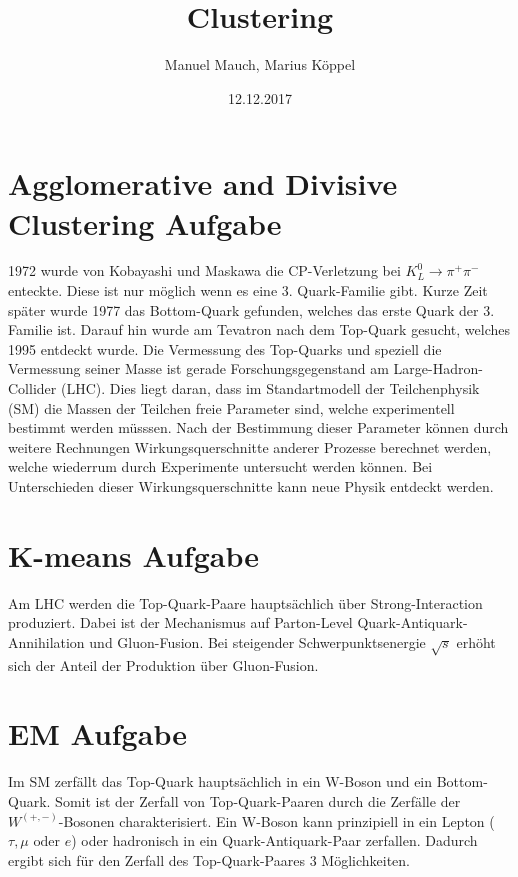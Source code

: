 \documentclass[a4paper]{article}
\title{Clustering}
\author{Manuel Mauch, Marius Köppel}
\date{12.12.2017}
\begin{document}
\maketitle

\section{Agglomerative and Divisive Clustering Aufgabe}
1972 wurde von Kobayashi und Maskawa die CP-Verletzung bei $K^0_L \rightarrow \pi^+ \pi^-$ enteckte. Diese ist nur möglich wenn es eine 3. Quark-Familie gibt. Kurze Zeit später wurde 1977 das Bottom-Quark gefunden, welches das erste Quark der 3. Familie ist. Darauf hin wurde am Tevatron nach dem Top-Quark gesucht, welches 1995 entdeckt wurde. Die Vermessung des Top-Quarks und speziell die Vermessung seiner Masse ist gerade Forschungsgegenstand am Large-Hadron-Collider (LHC). Dies liegt daran, dass im Standartmodell der Teilchenphysik (SM) die Massen der Teilchen freie Parameter sind, welche experimentell bestimmt werden müsssen. Nach der Bestimmung dieser Parameter können durch weitere Rechnungen Wirkungsquerschnitte anderer Prozesse berechnet werden, welche wiederrum durch Experimente untersucht werden können. Bei Unterschieden dieser Wirkungsquerschnitte kann neue Physik entdeckt werden.

\section{K-means Aufgabe}
Am LHC werden die Top-Quark-Paare hauptsächlich über Strong-Interaction produziert. Dabei ist der Mechanismus auf Parton-Level Quark-Antiquark-Annihilation und Gluon-Fusion. Bei steigender Schwerpunktsenergie $\sqrt{s}$ erhöht sich der Anteil der Produktion über Gluon-Fusion.

\section{EM Aufgabe}
Im SM zerfällt das Top-Quark hauptsächlich in ein W-Boson und ein Bottom-Quark. Somit ist der Zerfall von Top-Quark-Paaren durch die Zerfälle der $W^{(+,-)}$-Bosonen charakterisiert. Ein W-Boson kann prinzipiell in ein Lepton ($\tau, \mu \textrm{ oder } e$) oder hadronisch in ein Quark-Antiquark-Paar zerfallen. Dadurch ergibt sich für den Zerfall des Top-Quark-Paares 3 Möglichkeiten. 
\end{document}
